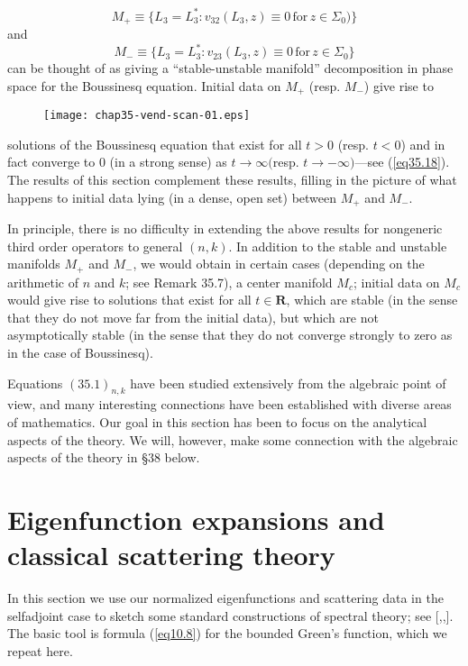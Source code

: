 \documentclass{surv-l}
\theoremstyle{plain}
\theoremstyle{definition}
\numberwithin{equation}{chapter}
\begin{document}
\begin{equation*}
M_{+}\equiv\{L_{3}=L_{3}^{*}:v_{32} (L_{3}, z)\equiv 0\,\mathrm{for}\, z\in\Sigma_{0})\}
\end{equation*}
and
\begin{equation*}
M_{-}\equiv\{L_{3}=L_{3}^{*}:v_{23} (L_{3}, z)\equiv 0\,\mathrm{for}\, z\in\Sigma_{0}\}
\end{equation*}
can be thought of as giving a ``stable-unstable manifold'' decomposition in phase space for the Boussinesq equation. Initial data on $M_{+}$ (resp. $M_{-}$) give rise to
\begin{figure}
\texttt{[image: chap35-vend-scan-01.eps]}
\caption{}\label{fig15}
\end{figure}
solutions of the Boussinesq equation that exist for all $t>0$ (resp. $t<0$) and in fact converge to $0$ (in a strong sense) as $ t\rightarrow\infty ($resp. $t\rightarrow-\infty)$---see (\ref{eq35.18}). The results of this section complement these results, filling in the picture of what happens to initial data lying (in a dense, open set) between $M_{+}$ and $M_{-}$.

In principle, there is no difficulty in extending the above results for nongeneric third order operators to general $(n, k)$. In addition to the stable and unstable manifolds $M_{+}$ and $M_{-}$, we would obtain in certain cases (depending on the arithmetic of $n$ and $k$; see Remark 35.7), a center manifold $M_{c}$; initial data on $M_{c}$ would give rise to solutions that exist for all $t\in \mathbf{R}$, which are stable (in the sense that they do not move far from the initial data), but which are not asymptotically stable (in the sense that they do not converge strongly to zero as in the case of Boussinesq).

Equations $(35.1)_{n,k}$ have been studied extensively from the algebraic point of view, and many interesting connections have been established with diverse areas of mathematics. Our goal in this section has been to focus on the analytical aspects of the theory. We will, however, make some connection with the algebraic aspects of the theory in \S 38 below.

\section{Eigenfunction expansions and classical scattering theory}\label{sec36}
In this section we use our normalized eigenfunctions and scattering data in the selfadjoint case to sketch some standard constructions of spectral theory; see [\cite{Na},\cite{RS},\cite{We}]. The basic tool is formula (\ref{eq10.8}) for the bounded Green's function, which we repeat here.
\end{document}
